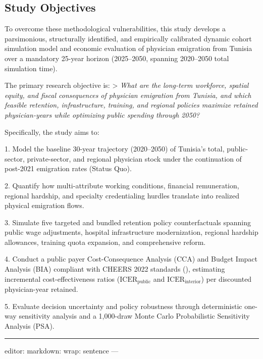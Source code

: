 \documentclass[
  11pt,
  a4paper]{article}
\begin{document}
\subsection{Study Objectives}\label{sec-intro-objectives}

To overcome these methodological vulnerabilities, this study develops a
parsimonious, structurally identified, and empirically calibrated
dynamic cohort simulation model and economic evaluation of physician
emigration from Tunisia over a mandatory 25-year horizon (2025--2050,
spanning 2020--2050 total simulation time).

The primary research objective is: \textgreater{} \emph{What are the
long-term workforce, spatial equity, and fiscal consequences of
physician emigration from Tunisia, and which feasible retention,
infrastructure, training, and regional policies maximize retained
physician-years while optimizing public spending through 2050?}

Specifically, the study aims to:

1. Model the baseline 30-year trajectory (2020--2050) of Tunisia's
total, public-sector, private-sector, and regional physician stock under
the continuation of post-2021 emigration rates (Status Quo).

2. Quantify how multi-attribute working conditions, financial
remuneration, regional hardship, and specialty credentialing hurdles
translate into realized physical emigration flows.

3. Simulate five targeted and bundled retention policy counterfactuals
spanning public wage adjustments, hospital infrastructure modernization,
regional hardship allowances, training quota expansion, and
comprehensive reform.

4. Conduct a public payer Cost-Consequence Analysis (CCA) and Budget
Impact Analysis (BIA) compliant with CHEERS 2022 standards
(), estimating
incremental cost-effectiveness ratios (\(\text{ICER}_{\text{public}}\)
and \(\text{ICER}_{\text{interior}}\)) per discounted physician-year
retained.

5. Evaluate decision uncertainty and policy robustness through
deterministic one-way sensitivity analysis and a 1,000-draw Monte Carlo
Probabilistic Sensitivity Analysis (PSA).

\begin{center}\rule{0.5\linewidth}{0.5pt}\end{center}

editor: markdown: wrap: sentence ---
\end{document}
